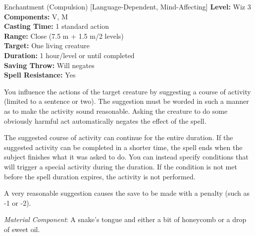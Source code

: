 {Enchantment (Compulsion) [Language-Dependent, Mind-Affecting]}
{
	\textbf{Level:}
	Wiz 3\\
	\textbf{Components:}
	V, M\\
	\textbf{Casting Time:}
	1 standard action\\
	\textbf{Range:}
	Close (7.5 m + 1.5 m/2 levels)\\
	\textbf{Target:}
	One living creature\\
	\textbf{Duration:}
	1 hour/level or until completed\\
	\textbf{Saving Throw:}
	Will negates\\
	\textbf{Spell Resistance:}
	Yes\\
}
{
	You influence the actions of the target creature by suggesting a course of activity (limited to a sentence or two). The suggestion must be worded in such a manner as to make the activity sound reasonable. Asking the creature to do some obviously harmful act automatically negates the effect of the spell.

	The suggested course of activity can continue for the entire duration. If the suggested activity can be completed in a shorter time, the spell ends when the subject finishes what it was asked to do. You can instead specify conditions that will trigger a special activity during the duration. If the condition is not met before the spell duration expires, the activity is not performed.

	A very reasonable suggestion causes the save to be made with a penalty (such as -1 or -2).

	\textit{Material Component}:
	A snake's tongue and either a bit of honeycomb or a drop of sweet oil.

}
